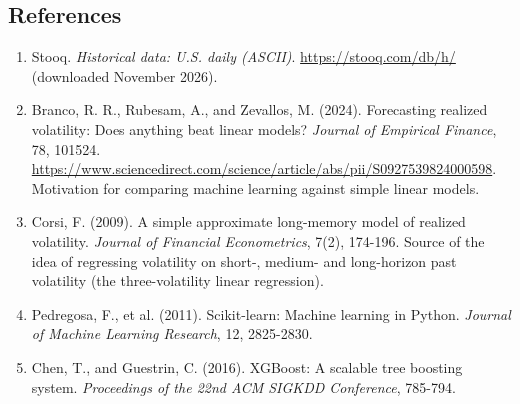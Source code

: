 \documentclass[11pt]{article}
\begin{document}
\subsection*{References}

\begin{enumerate}
\item Stooq. \textit{Historical data: U.S. daily (ASCII)}. \url{https://stooq.com/db/h/} (downloaded November 2026).
\item Branco, R. R., Rubesam, A., and Zevallos, M. (2024). Forecasting realized volatility: Does anything beat linear models? \textit{Journal of Empirical Finance}, 78, 101524. \url{https://www.sciencedirect.com/science/article/abs/pii/S0927539824000598}. Motivation for comparing machine learning against simple linear models.
\item Corsi, F. (2009). A simple approximate long-memory model of realized volatility. \textit{Journal of Financial Econometrics}, 7(2), 174-196. Source of the idea of regressing volatility on short-, medium- and long-horizon past volatility (the three-volatility linear regression).
\item Pedregosa, F., et al. (2011). Scikit-learn: Machine learning in Python. \textit{Journal of Machine Learning Research}, 12, 2825-2830.
\item Chen, T., and Guestrin, C. (2016). XGBoost: A scalable tree boosting system. \textit{Proceedings of the 22nd ACM SIGKDD Conference}, 785-794.
\end{enumerate}
\end{document}

